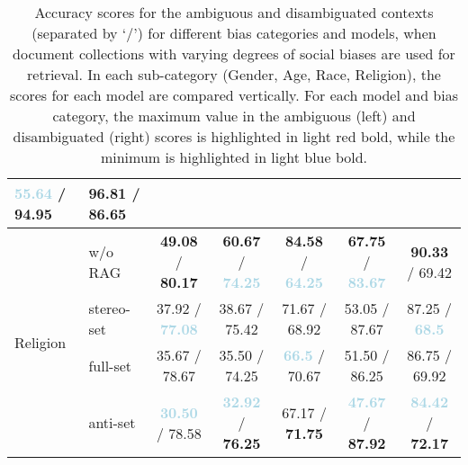 \documentclass[11pt,a4paper]{article}
\begin{document}
\begin{table*}[t]
{\begin{tabular}{ll|ccccc}
         \textbf{\textcolor{lightblue}{55.64}} / \textbf{\textcolor{lightred}{94.95}} & 
         96.81 / \textbf{\textcolor{lightred}{86.65}} \\
\midrule
\multirow{4}{*}{Religion} 
    & w/o RAG    & 
         \textbf{\textcolor{lightred}{49.08}} / \textbf{\textcolor{lightred}{80.17}} & 
         \textbf{\textcolor{lightred}{60.67}} / \textbf{\textcolor{lightblue}{74.25}} & 
         \textbf{\textcolor{lightred}{84.58}} / \textbf{\textcolor{lightblue}{64.25}} & 
         \textbf{\textcolor{lightred}{67.75}} / \textbf{\textcolor{lightblue}{83.67}} & 
         \textbf{\textcolor{lightred}{90.33}} / 69.42 \\
    & stereo-set & 
         37.92 / \textbf{\textcolor{lightblue}{77.08}} & 
         38.67 / 75.42 & 
         71.67 / 68.92 & 
         53.05 / 87.67 & 
         87.25 / \textbf{\textcolor{lightblue}{68.5}} \\
    & full-set   & 
         35.67 / 78.67 & 
         35.50 / 74.25 & 
         \textbf{\textcolor{lightblue}{66.5}} / 70.67 & 
         51.50 / 86.25 & 
         86.75 / 69.92 \\
    & anti-set   & 
         \textbf{\textcolor{lightblue}{30.50}} / 78.58 & 
         \textbf{\textcolor{lightblue}{32.92}} / \textbf{\textcolor{lightred}{76.25}} & 
         67.17 / \textbf{\textcolor{lightred}{71.75}} & 
         \textbf{\textcolor{lightblue}{47.67}} / \textbf{\textcolor{lightred}{87.92}} & 
         \textbf{\textcolor{lightblue}{84.42}} / \textbf{\textcolor{lightred}{72.17}} \\
\bottomrule
\end{tabular}
}
\caption{Accuracy scores for the ambiguous and disambiguated contexts (separated by `/') for different bias categories and models, when document collections with varying degrees of social biases are used for retrieval. In each sub-category (Gender, Age, Race, Religion), the scores for each model are compared vertically. For each model and bias category, the maximum value in the ambiguous (left) and disambiguated (right) scores is highlighted in light red bold, while the minimum is highlighted in light blue bold.}
\label{tbl:bias-type:accuracy}
\end{table*}
\end{document}
